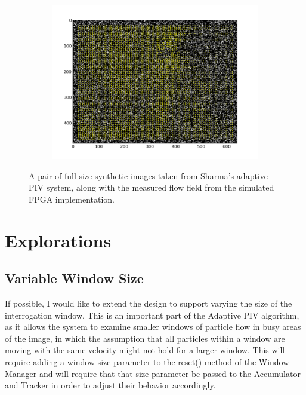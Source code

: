 \documentclass{article}
\begin{document}
\begin{figure}
	\begin{subfigure}[htb]{\textwidth}
		\centerline{\includegraphics[trim = .4in .4in .4in .4in, clip, width=1.5\textwidth]{fig/vort_sim_non_adapt.png}}
	\end{subfigure}
	\caption{A pair of full-size synthetic images taken from Sharma's adaptive PIV system, along with the measured flow field from the simulated FPGA implementation.}
	\label{fig:full_test}
\end{figure}

\section{Explorations}
\subsection{Variable Window Size}
If possible, I would like to extend the design to support varying the size of the interrogation window. This is an important part of the Adaptive PIV algorithm, as it allows the system to examine smaller windows of particle flow in busy areas of the image, in which the assumption that all particles within a window are moving with the same velocity might not hold for a larger window. This will require adding a window size parameter to the reset() method of the Window Manager and will require that that size parameter be passed to the Accumulator and Tracker in order to adjust their behavior accordingly. 
\end{document}
